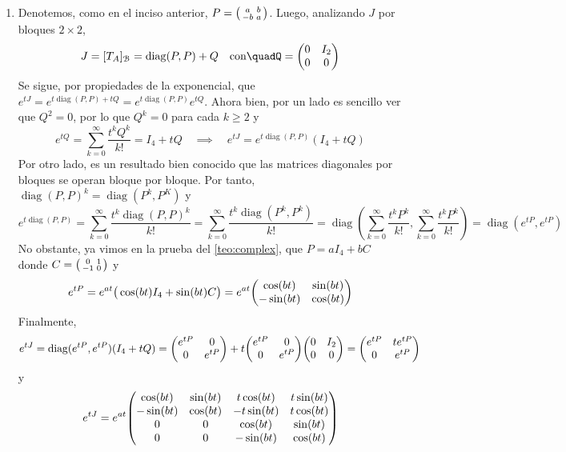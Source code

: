\begin{sol}
\begin{enumerate}[leftmargin=*, label=(\alph*)]
\item Denotemos, como en el inciso anterior, $P = \smqty(a&b\\-b&a)$. Luego, analizando $J$ por bloques $2\times2$,
\[
J = [T_A]_\mathcal{B} =\operatorname{diag}(P,P) + Q%
\quad\text{con}\quad%
Q = \mqty(0&I_2\\0&0)
\]
Se sigue, por propiedades de la exponencial, que $e^{tJ} = e^{t\operatorname{diag}(P,P) + tQ} = e^{t\operatorname{diag}(P,P)}e^{tQ}$. Ahora bien, por un lado es sencillo ver que $Q^2 = 0$, por lo que $Q^k = 0$ para cada $k \geq 2$ y
\[
e^{tQ} = \sum^\infty_{k=0}\frac{t^kQ^k}{k!} = I_4 + tQ%
\quad\implies\quad%
e^{tJ} = e^{t\operatorname{diag}(P,P)}(I_4 + tQ)
\]
Por otro lado, es un resultado bien conocido que las matrices diagonales por bloques se operan bloque por bloque. Por tanto, $\operatorname{diag}(P,P)^k = \operatorname{diag}(P^k,P^K)$ y 
\[
e^{t\operatorname{diag}(P,P)}%
= \sum^\infty_{k=0}\frac{t^k\operatorname{diag}(P,P)^k}{k!}%
= \sum^\infty_{k=0}\frac{t^k\operatorname{diag}(P^k,P^k)}{k!}%
= \operatorname{diag}\left(%
    \sum^\infty_{k=0} \frac{t^kP^k}{k!},%
    \sum^\infty_{k=0} \frac{t^kP^k}{k!}
\right)%
= \operatorname{diag}(e^{tP}, e^{tP})
\]
No obstante, ya vimos en la prueba del \cref{teo:complex}, que $P = aI_4 + bC$ donde $C = \smqty(0&1\\-1&0)$ y
\[
e^{tP}%
= e^{at}\big(%
    \cos(bt)I_4 + \sin(bt)C
\big)%
= e^{at}\mqty(\cos(bt)&\sin(bt)\\-\sin(bt)&\cos(bt))
\]
Finalmente,
\[
e^{tJ}%
= \operatorname{diag}(e^{tP},e^{tP})(I_4 + tQ)%
=\mqty(e^{tP}&0\\0&e^{tP}) + t\mqty(e^{tP}&0\\0&e^{tP})\mqty(0&I_2\\0&0) = \mqty(e^{tP}&te^{tP}\\0&e^{tP})%
\]
y
\[
e^{tJ}%
= e^{at}\mqty(%
 \cos(bt)& \sin(bt)& t\cos(bt)&t\sin(bt)\\
-\sin(bt)& \cos(bt)&-t\sin(bt)&t\cos(bt)\\
    0    &    0    &  \cos(bt)& \sin(bt)\\
    0    &    0    & -\sin(bt)& \cos(bt)%
)%
\]
\end{enumerate}
\end{sol}
